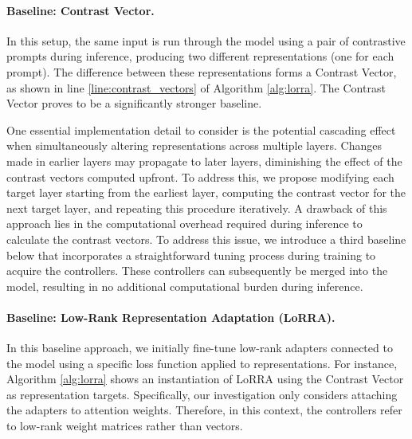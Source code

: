 \paragraph{Baseline: Contrast Vector.}

In this setup, the same input is run through the model using a pair of contrastive prompts during inference, producing two different representations (one for each prompt). The difference between these representations forms a Contrast Vector, as shown in line \ref{line:contrast_vectors} of Algorithm \ref{alg:lorra}. The Contrast Vector proves to be a significantly stronger baseline.

One essential implementation detail to consider is the potential cascading effect when simultaneously altering representations across multiple layers. Changes made in earlier layers may propagate to later layers, diminishing the effect of the contrast vectors computed upfront. To address this, we propose modifying each target layer starting from the earliest layer, computing the contrast vector for the next target layer, and repeating this procedure iteratively. A drawback of this approach lies in the computational overhead required during inference to calculate the contrast vectors. To address this issue, we introduce a third baseline below that incorporates a straightforward tuning process during training to acquire the controllers. These controllers can subsequently be merged into the model, resulting in no additional computational burden during inference.

\paragraph{Baseline: Low-Rank Representation Adaptation (LoRRA).}
In this baseline approach, we initially fine-tune low-rank adapters connected to the model using a specific loss function applied to representations. For instance, Algorithm \ref{alg:lorra} shows an instantiation of LoRRA using the Contrast Vector as representation targets. Specifically, our investigation only considers attaching the adapters to attention weights. Therefore, in this context, the controllers refer to low-rank weight matrices rather than vectors.


